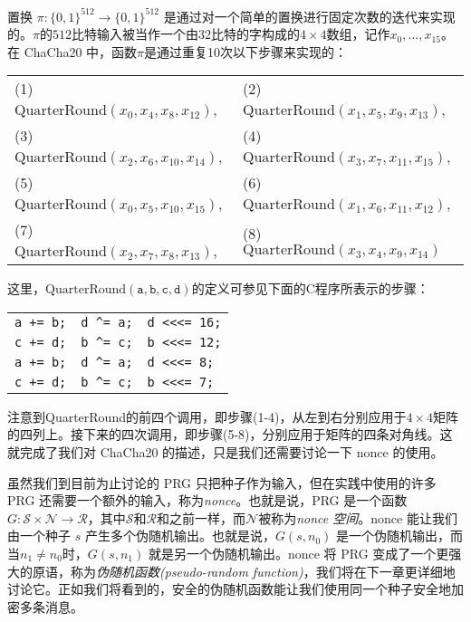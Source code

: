 \begin{snote}[一些细节。]
置换 $\pi:\{0,1\}^{512}\to\{0,1\}^{512}$ 是通过对一个简单的置换进行固定次数的迭代来实现的。$\pi$的$512$比特输入被当作一个由$32$比特的字构成的$4\times4$数组，记作$x_0,\dots,x_{15}$。在 ChaCha20 中，函数$\pi$是通过重复10次以下步骤来实现的：
\begin{center}
\begin{tabular}{ll}
 (1) $\mathrm{QuarterRound}(x_0,x_4,x_8,x_{12})$, & (2) $\mathrm{QuarterRound}(x_1,x_5,x_9,x_{13})$,\\ 
 (3) $\mathrm{QuarterRound}(x_2,x_6,x_{10},x_{14})$, & (4) $\mathrm{QuarterRound}(x_3,x_7,x_{11},x_{15})$,\\  
 (5) $\mathrm{QuarterRound}(x_0,x_5,x_{10},x_{15})$, & (6) $\mathrm{QuarterRound}(x_1,x_6,x_{11},x_{12})$,\\
 (7) $\mathrm{QuarterRound}(x_2,x_7,x_8,x_{13})$, & (8) $\mathrm{QuarterRound}(x_3,x_4,x_9,x_{14})$\\
\end{tabular}
\end{center}
这里，$\mathrm{QuarterRound}(\texttt{a},\texttt{b},\texttt{c},\texttt{d})$的定义可参见下面的C程序所表示的步骤：
\begin{center}
\begin{tabular}{lll}
\texttt{a += b;} & \texttt{d \^{}=  a;} & \texttt{d <<<= 16;}\\
\texttt{c += d;} & \texttt{b \^{}=  c;} & \texttt{b <<<= 12;}\\
\texttt{a += b;} & \texttt{d \^{}=  a;} & \texttt{d <<<= 8;}\\
\texttt{c += d;} & \texttt{b \^{}=  c;} & \texttt{b <<<= 7;}
\end{tabular}
\end{center}
注意到QuarterRound的前四个调用，即步骤(1-4)，从左到右分别应用于$4\times4$矩阵的四列上。接下来的四次调用，即步骤(5-8)，分别应用于矩阵的四条对角线。这就完成了我们对 ChaCha20 的描述，只是我们还需要讨论一下 nonce 的使用。
\end{snote}

\begin{snote}[使用nonce。]
虽然我们到目前为止讨论的 PRG 只把种子作为输入，但在实践中使用的许多 PRG 还需要一个额外的输入，称为\emph{nonce}。也就是说，PRG 是一个函数 $G:\mathcal{S}\times\mathcal{N}\to\mathcal{R}$，其中$\mathcal{S}$和$\mathcal{R}$和之前一样，而$\mathcal{N}$被称为\emph{nonce 空间}。nonce 能让我们由一个种子 $s$ 产生多个伪随机输出。也就是说，$G(s,n_0)$ 是一个伪随机输出，而当$n_1\neq n_0$时，$G(s,n_1)$ 就是另一个伪随机输出。nonce 将 PRG 变成了一个更强大的原语，称为\emph{伪随机函数(pseudo-random function)}，我们将在下一章更详细地讨论它。正如我们将看到的，安全的伪随机函数能让我们使用同一个种子安全地加密多条消息。
\end{snote}